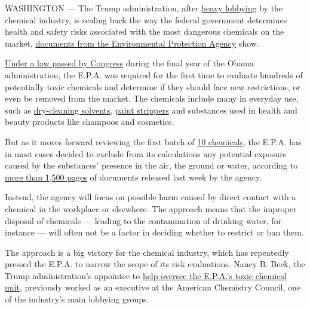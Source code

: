 WASHINGTON --- The Trump administration, after
\href{https://www.documentcloud.org/documents/4496312-How-the-EPA-Revised-the-Way-It-Will-Evaluate.html\#document/p24/a427924}{heavy
lobbying} by the chemical industry, is scaling back the way the federal
government determines health and safety risks associated with the most
dangerous chemicals on the market,
\href{https://www.documentcloud.org/documents/4496312-How-the-EPA-Revised-the-Way-It-Will-Evaluate.html}{documents
from the Environmental Protection Agency} show.

\href{https://www.epa.gov/assessing-and-managing-chemicals-under-tsca/frank-r-lautenberg-chemical-safety-21st-century-act}{Under
a law passed by Congress} during the final year of the Obama
administration, the E.P.A. was required for the first time to evaluate
hundreds of potentially toxic chemicals and determine if they should
face new restrictions, or even be removed from the market. The chemicals
include many in everyday use, such as
\href{https://www.epa.gov/sites/production/files/2016-09/documents/tetrachloroethylene.pdf}{dry-cleaning
solvents},
\href{https://www.epa.gov/sites/production/files/2014-03/documents/ffrro_factsheet_contaminant_14-dioxane_january2014_final.pdf}{paint
strippers} and substances used in health and beauty products like
shampoos and cosmetics.

But as it moves forward reviewing the first batch of
\href{https://www.nytimes3xbfgragh.onion/2017/10/21/us/epa-toxic-chemicals.html}{10
chemicals}, the E.P.A. has in most cases decided to exclude from its
calculations any potential exposure caused by the substances' presence
in the air, the ground or water, according to
\href{https://www.documentcloud.org/documents/4495888-Problem-Forumulations.html}{more
than 1,500 pages} of documents released last week by the agency.

Instead, the agency will focus on possible harm caused by direct contact
with a chemical in the workplace or elsewhere. The approach means that
the improper disposal of chemicals --- leading to the contamination of
drinking water, for instance --- will often not be a factor in deciding
whether to restrict or ban them.

The approach is a big victory for the chemical industry, which has
repeatedly pressed the E.P.A. to narrow the scope of its risk
evaluations. Nancy B. Beck, the Trump administration's appointee to
\href{https://www.nytimes3xbfgragh.onion/2017/10/21/us/trump-epa-chemicals-regulations.html}{help
oversee the E.P.A.'s toxic chemical unit}, previously worked as an
executive at the American Chemistry Council, one of the industry's main
lobbying groups.

